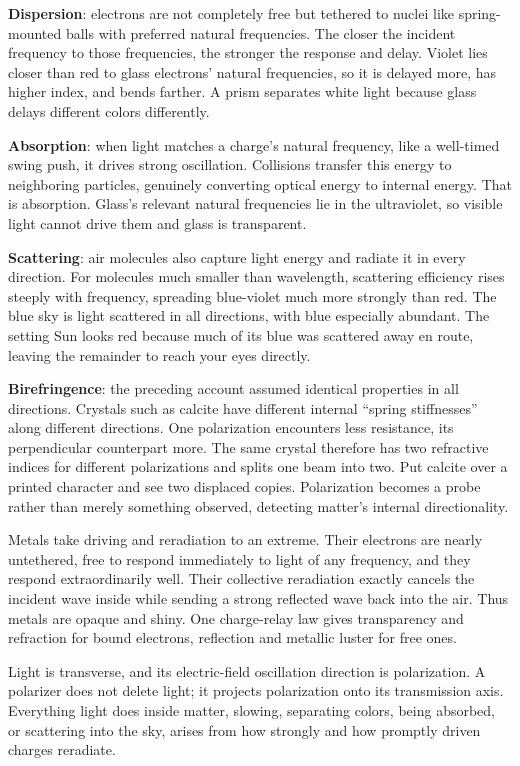 \textbf{Dispersion}: electrons are not completely free but tethered to nuclei like spring-mounted balls with preferred natural frequencies. The closer the incident frequency to those frequencies, the stronger the response and delay. Violet lies closer than red to glass electrons' natural frequencies, so it is delayed more, has higher index, and bends farther. A prism separates white light because glass delays different colors differently.

\textbf{Absorption}: when light matches a charge's natural frequency, like a well-timed swing push, it drives strong oscillation. Collisions transfer this energy to neighboring particles, genuinely converting optical energy to internal energy. That is absorption. Glass's relevant natural frequencies lie in the ultraviolet, so visible light cannot drive them and glass is transparent.

\textbf{Scattering}: air molecules also capture light energy and radiate it in every direction. For molecules much smaller than wavelength, scattering efficiency rises steeply with frequency, spreading blue-violet much more strongly than red. The blue sky is light scattered in all directions, with blue especially abundant. The setting Sun looks red because much of its blue was scattered away en route, leaving the remainder to reach your eyes directly.

\textbf{Birefringence}: the preceding account assumed identical properties in all directions. Crystals such as calcite have different internal ``spring stiffnesses'' along different directions. One polarization encounters less resistance, its perpendicular counterpart more. The same crystal therefore has two refractive indices for different polarizations and splits one beam into two. Put calcite over a printed character and see two displaced copies. Polarization becomes a probe rather than merely something observed, detecting matter's internal directionality.

Metals take driving and reradiation to an extreme. Their electrons are nearly untethered, free to respond immediately to light of any frequency, and they respond extraordinarily well. Their collective reradiation exactly cancels the incident wave inside while sending a strong reflected wave back into the air. Thus metals are opaque and shiny. One charge-relay law gives transparency and refraction for bound electrons, reflection and metallic luster for free ones.


\begin{oneline}
Light is transverse, and its electric-field oscillation direction is polarization. A polarizer does not delete light; it projects polarization onto its transmission axis. Everything light does inside matter, slowing, separating colors, being absorbed, or scattering into the sky, arises from how strongly and how promptly driven charges reradiate.
\end{oneline}

